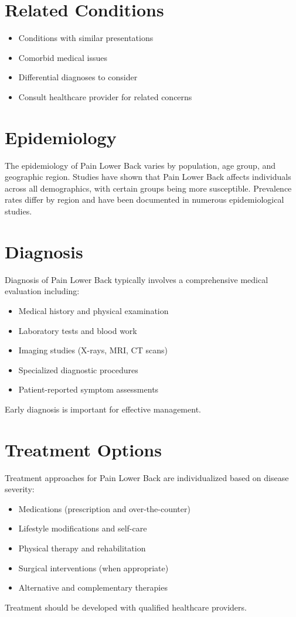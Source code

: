 \section*{Related Conditions}
\begin{itemize}
  \item Conditions with similar presentations
  \item Comorbid medical issues
  \item Differential diagnoses to consider
  \item Consult healthcare provider for related concerns
\end{itemize}

\section*{Epidemiology}
The epidemiology of Pain Lower Back varies by population, age group, and geographic region. Studies have shown that Pain Lower Back affects individuals across all demographics, with certain groups being more susceptible. Prevalence rates differ by region and have been documented in numerous epidemiological studies.

\section*{Diagnosis}
Diagnosis of Pain Lower Back typically involves a comprehensive medical evaluation including:
\begin{itemize}
  \item Medical history and physical examination
  \item Laboratory tests and blood work
  \item Imaging studies (X-rays, MRI, CT scans)
  \item Specialized diagnostic procedures
  \item Patient-reported symptom assessments
\end{itemize}
Early diagnosis is important for effective management.

\section*{Treatment Options}
Treatment approaches for Pain Lower Back are individualized based on disease severity:
\begin{itemize}
  \item Medications (prescription and over-the-counter)
  \item Lifestyle modifications and self-care
  \item Physical therapy and rehabilitation
  \item Surgical interventions (when appropriate)
  \item Alternative and complementary therapies
\end{itemize}
Treatment should be developed with qualified healthcare providers.

